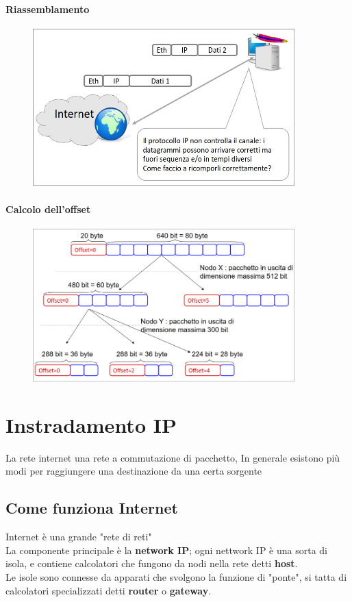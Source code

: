 \documentclass{report}
\begin{document}
            \subsubsection{Riassemblamento}
                \begin{figure}[H]
                    \includegraphics[width=0.9\textwidth]{1/rias.png}
                \end{figure}
            \subsubsection{Calcolo dell'offset}
                \begin{figure}[H]
                    \includegraphics[width=0.9\textwidth]{1/calc.png}
                \end{figure}
    \chapter{Instradamento IP}
        La rete internet  una rete a commutazione di pacchetto, In generale esistono più modi per raggiungere una destinazione da una certa sorgente 
        \section{Come funziona Internet}
            Internet è una grande "rete di reti"
            \\
            La componente principale è la\textbf{ network IP}; ogni nettwork IP è una sorta di isola, e contiene calcolatori che fungono da nodi nella rete detti \textbf{host}.
            \\
            Le isole sono connesse da apparati che svolgono la funzione di "ponte", si tatta di calcolatori specializzati detti \textbf{router} o \textbf{gateway}.
\end{document}
